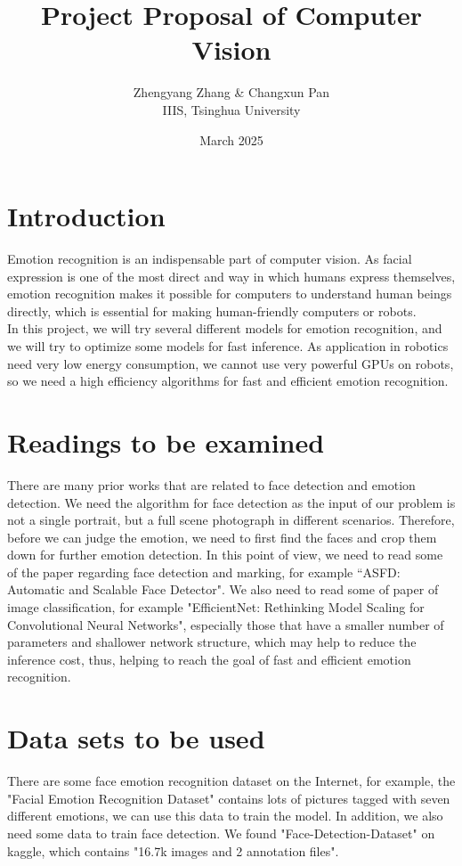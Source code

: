 \documentclass[10pt,twocolumn,letterpaper]{article}
\title{Project Proposal of Computer Vision}
\author{Zhengyang Zhang \& Changxun Pan\\ 
IIIS, Tsinghua University\\}
\date{March 2025}
\begin{document}
\maketitle
\section{Introduction}
Emotion recognition is an indispensable part of computer vision. As facial expression is one of the most direct and way in which humans express themselves, emotion recognition makes it possible for computers to understand human beings directly, which is essential for making human-friendly computers or robots.\\

In this project, we will try several different models for emotion recognition, and we will try to optimize some models for fast inference. As application in robotics need very low energy consumption, we cannot use very powerful GPUs on robots, so we need a high efficiency algorithms for fast and efficient emotion recognition.


\section{Readings to be examined}
There are many prior works that are related to face detection and emotion detection. We need the algorithm for face detection as the input of our problem is not a single portrait, but a full scene photograph in different scenarios. Therefore, before we can judge the emotion, we need to first find the faces and crop them down for further emotion detection. In this point of view, we need to read some of the paper regarding face detection and marking, for example ``ASFD: Automatic and Scalable Face Detector"\cite{ASFD}. We also need to read some of paper of image classification, for example "EfficientNet: Rethinking Model Scaling for Convolutional Neural Networks"\cite{EfficientNet}, especially those that have a smaller number of parameters and shallower network structure, which may help to reduce the inference cost, thus, helping to reach the goal of fast and efficient emotion recognition.

\section{Data sets to be used}
There are some face emotion recognition dataset on the Internet, for example, the "Facial Emotion Recognition Dataset" contains lots of pictures tagged with seven different emotions, we can use this data to train the model. In addition, we also need some data to train face detection. We found "Face-Detection-Dataset" on kaggle, which contains "16.7k images and 2 annotation files". 
\end{document}
